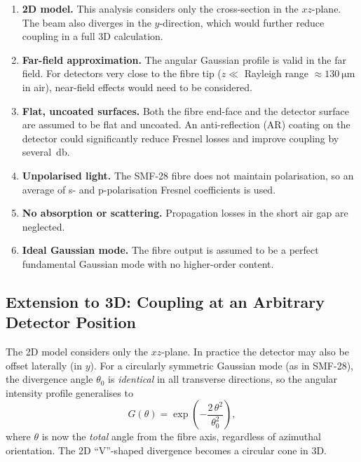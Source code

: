 \begin{enumerate}
  \item \textbf{2D model.}  This analysis considers only the
    cross-section in the $xz$-plane.  The beam also diverges in the
    $y$-direction, which would further reduce coupling in a full 3D
    calculation.

  \item \textbf{Far-field approximation.}  The angular Gaussian profile
    is valid in the far field.  For detectors very close to the fibre
    tip ($z \ll $ Rayleigh range $\approx \SI{130}{\micro\metre}$ in
    air), near-field effects would need to be considered.

  \item \textbf{Flat, uncoated surfaces.}  Both the fibre end-face and
    the detector surface are assumed to be flat and uncoated.  An
    anti-reflection (AR) coating on the detector could significantly
    reduce Fresnel losses and improve coupling by several~\si{\decibel}.

  \item \textbf{Unpolarised light.}  The SMF-28 fibre does not maintain
    polarisation, so an average of s- and p-polarisation Fresnel
    coefficients is used.

  \item \textbf{No absorption or scattering.}  Propagation losses in
    the short air gap are neglected.

  \item \textbf{Ideal Gaussian mode.}  The fibre output is assumed to be
    a perfect fundamental Gaussian mode with no higher-order content.
\end{enumerate}

\subsection{Extension to 3D: Coupling at an Arbitrary Detector Position}

The 2D model considers only the $xz$-plane.  In practice the detector may
also be offset laterally (in $y$).  For a circularly symmetric Gaussian
mode (as in SMF-28), the divergence angle $\theta_0$ is \emph{identical}
in all transverse directions, so the angular intensity profile generalises
to
%
\begin{equation}\label{eq:G3D}
  G(\theta) = \exp\!\left(-\frac{2\,\theta^2}{\theta_0^2}\right),
\end{equation}
%
where $\theta$ is now the \emph{total} angle from the fibre axis,
regardless of azimuthal orientation.  The 2D ``V''-shaped divergence
becomes a circular cone in 3D.

